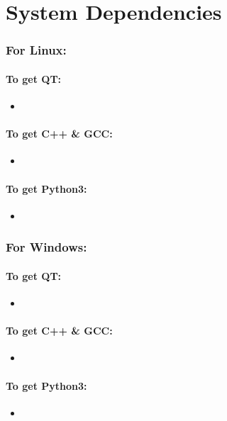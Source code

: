 \chapter{System Dependencies}
  \subsection{For Linux:}
  \subsubsection*{To get QT:}
    \begin{itemize}
      \item
    \end{itemize}
  \subsubsection*{To get C++ \& GCC:}
    \begin{itemize}
      \item
    \end{itemize}
  \subsubsection*{To get Python3:}
    \begin{itemize}
      \item
    \end{itemize}

  \bigskip
  \subsection{For Windows:}
  \subsubsection*{To get QT:}
    \begin{itemize}
      \item
    \end{itemize}
  \subsubsection*{To get C++ \& GCC:}
    \begin{itemize}
      \item
    \end{itemize}
  \subsubsection*{To get Python3:}
    \begin{itemize}
      \item
    \end{itemize}

